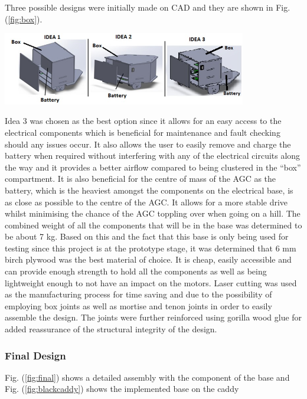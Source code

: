 \documentclass[11pt,landscape]{article}
\newenvironment{Figure}
  {\par\medskip\noindent\minipage{\linewidth}}
  {\endminipage\par\medskip}
\begin{document}
\begin{multicols}{2}
    Three possible designs were initially made on CAD and they are shown in
    Fig. (\ref{fig:box}).
    
    \begin{Figure}
        \begin{center}
            \includegraphics[width=0.8\textwidth]{Figure23.jpg}
            \label{fig:box}
        \end{center}
    \end{Figure}
    
    
    Idea 3 was chosen as the best option since it allows for an easy access to
    the electrical components which is beneficial for maintenance and fault
    checking should any issues occur. It also allows the user to easily remove
    and charge the battery when required without interfering with any of the
    electrical circuits along the way and it provides a better airflow compared
    to being clustered in the “box” compartment. It is also beneficial for the
    centre of mass of the AGC as the battery, which is the heaviest amongst
    the components on the electrical base, is as close as possible to the centre
    of the AGC. It allows for a more stable drive whilst minimising the chance
    of the AGC toppling over when going on a hill. The combined weight of all
    the components that will be in the base was determined to be about 7 kg.
    Based on this and the fact that this base is only being used for testing
    since this project is at the prototype stage, it was determined that 6 mm
    birch plywood was the best material of choice. It is cheap, easily
    accessible and can provide enough strength to hold all the components as
    well as being lightweight enough to not have an impact on the motors. Laser
    cutting was used as the manufacturing process for time saving and due to the
    possibility of employing box joints as well as mortise and tenon joints in
    order to easily assemble the design. The joints were further reinforced
    using gorilla wood glue for added reassurance of the structural integrity of
    the design.
    
    
\subsubsection{Final Design}
Fig. (\ref{fig:final}) shows a detailed assembly with the component of the base
and Fig. (\ref{fig:blackcaddy}) shows the implemented base on the caddy


\end{multicols}
\end{document}
